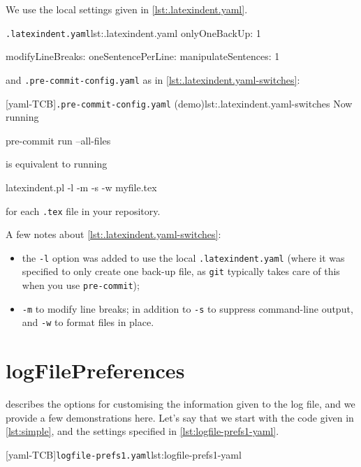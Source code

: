   \begin{example}
   We use the local settings given in \cref{lst:.latexindent.yaml}.
   \begin{cmhlistings}[style=tcblatex]{\texttt{.latexindent.yaml}}{lst:.latexindent.yaml}
onlyOneBackUp: 1

modifyLineBreaks:
 oneSentencePerLine:
   manipulateSentences: 1
\end{cmhlistings}

   and \texttt{.pre-commit-config.yaml} as in \cref{lst:.latexindent.yaml-switches}:

   [yaml-TCB]{\texttt{.pre-commit-config.yaml} (demo)}{lst:.latexindent.yaml-switches}
   Now running
   \begin{commandshell}
pre-commit run --all-files  
\end{commandshell}
   is equivalent to running
   \begin{commandshell}
latexindent.pl -l -m -s -w myfile.tex
\end{commandshell}
   for each \texttt{.tex} file in your repository.

   A few notes about \cref{lst:.latexindent.yaml-switches}:
   \begin{itemize}
    \item the \texttt{-l} option was added to use the local \texttt{.latexindent.yaml} (where it
          was specified to only create one back-up file, as \texttt{git} typically takes care of
          this when you use \texttt{pre-commit});
    \item \texttt{-m} to modify line breaks; in addition to \texttt{-s} to suppress command-line
          output, and \texttt{-w} to format files in place.
   \end{itemize}
  \end{example}

 \section{logFilePreferences}\label{app:logfile-demo}
   describes the options for customising the information given
  to the log file, and we provide a few demonstrations here. Let's say that we start with
  the code given in \cref{lst:simple}, and the settings specified in
  \cref{lst:logfile-prefs1-yaml}.

  \begin{minipage}{.35\linewidth}
  \end{minipage}
  \hfill
  \begin{minipage}{.6\linewidth}
   [yaml-TCB]{\texttt{logfile-prefs1.yaml}}{lst:logfile-prefs1-yaml}
  \end{minipage}

